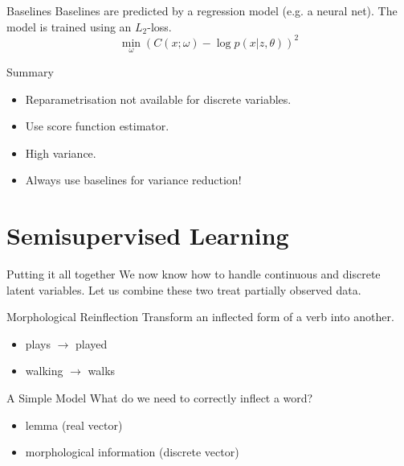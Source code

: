 \documentclass[14pt]{beamer}
\begin{document}
\begin{frame}{Baselines}
Baselines are predicted by a regression model (e.g. a neural net). The model is trained using 
an $ L_{2} $-loss.
\begin{equation*}
\min_\omega \left(C(x; \omega) - \log p(x|z,\theta)\right)^{2}
\end{equation*}
\end{frame}

\begin{frame}{Summary}
\begin{itemize}
\pause
\item Reparametrisation not available for discrete variables.
\pause
\item Use score function estimator.
\pause
\item High variance.
\pause
\item Always use baselines for variance reduction!
\end{itemize}
\end{frame}

\section{Semisupervised Learning}

\begin{frame}{Putting it all together}
We now know how to handle continuous and discrete latent variables. Let us combine these two treat partially observed data.
\pause
\begin{block}{Morphological Reinflection}
Transform an inflected form of a verb into another.
\begin{itemize}
\pause
\item plays $ \rightarrow $ played
\pause
\item walking $ \rightarrow $ walks
\end{itemize}
\end{block}
\end{frame}

\begin{frame}{A Simple Model \citep{ZhouNeubig:2017}}
What do we need to correctly inflect a word?
\pause
\begin{itemize}
\item lemma \pause (real vector)
\pause
\item morphological information \pause (discrete vector)
\end{itemize}
\end{frame}
\end{document}
